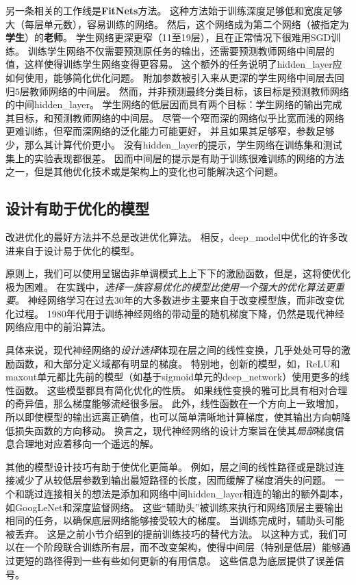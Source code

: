 另一条相关的工作线是\textbf{FitNets}\citep{Romero-et-al-ICLR2015-small}方法。
这种方法始于训练深度足够低和宽度足够大（每层单元数），容易训练的网络。
然后，这个网络成为第二个网络（被指定为\textbf{学生}）的\textbf{老师}。
学生网络更深更窄（11至19层），且在正常情况下很难用SGD训练。
训练学生网络不仅需要预测原任务的输出，还需要预测教师网络中间层的值，这样使得训练学生网络变得更容易。
这个额外的任务说明了\gls{hidden_layer}应如何使用，能够简化优化问题。
附加参数被引入来从更深的学生网络中间层去回归$5$层教师网络的中间层。
然而，并非预测最终分类目标，该目标是预测教师网络的中间\gls{hidden_layer}。
学生网络的低层因而具有两个目标：学生网络的输出完成其目标，和预测教师网络的中间层。
尽管一个窄而深的网络似乎比宽而浅的网络更难训练，但窄而深网络的泛化能力可能更好，
并且如果其足够窄，参数足够少，那么其计算代价更小。
没有\gls{hidden_layer}的提示，学生网络在训练集和测试集上的实验表现都很差。
因而中间层的提示是有助于训练很难训练的网络的方法之一，但是其他优化技术或是架构上的变化也可能解决这个问题。


\subsection{设计有助于优化的模型}
\label{sec:designing_models_to_aid_optimization}
改进优化的最好方法并不总是改进优化算法。
相反，\gls{deep_model}中优化的许多改进来自于设计易于优化的模型。

原则上，我们可以使用呈锯齿非单调模式上上下下的激励函数，但是，这将使优化极为困难。
在实践中，\emph{选择一族容易优化的模型比使用一个强大的优化算法更重要}。
神经网络学习在过去30年的大多数进步主要来自于改变模型族，而非改变优化过程。
1980年代用于训练神经网络的带动量的随机梯度下降，仍然是现代神经网络应用中的前沿算法。

具体来说，现代神经网络的\emph{设计选择}体现在层之间的线性变换，几乎处处可导的激励函数，和大部分定义域都有明显的梯度。
特别地，创新的模型，如，\gls{ReLU}和\gls{maxout}单元都比先前的模型（如基于\gls{sigmoid}单元的\gls{deep_network}）使用更多的线性函数。
这些模型都具有简化优化的性质。
如果线性变换的雅可比具有相对合理的奇异值，那么梯度能够流经很多层。
此外，线性函数在一个方向上一致增加，所以即使模型的输出远离正确值，也可以简单清晰地计算梯度，使其输出方向朝降低损失函数的方向移动。
换言之，现代神经网络的设计方案旨在使其\emph{局部}梯度信息合理地对应着移向一个遥远的解。

其他的模型设计技巧有助于使优化更简单。
例如，层之间的线性路径或是跳过连接减少了从较低层参数到输出最短路径的长度，因而缓解了梯度消失的问题\citep{Srivastava-et-al-arxiv2015}。
一个和跳过连接相关的想法是添加和网络中间\gls{hidden_layer}相连的输出的额外副本，如GoogLeNet\citep{Szegedy-et-al-arxiv2014}和深度监督网络\citep{Lee-et-al-2014}。
这些``辅助头''被训练来执行和网络顶层主要输出相同的任务，以确保底层网络能够接受较大的梯度。
当训练完成时，辅助头可能被丢弃。
这是之前小节介绍到的提前训练技巧的替代方法。
以这种方式，我们可以在一个阶段联合训练所有层，而不改变架构，使得中间层（特别是低层）能够通过更短的路径得到一些有些如何更新的有用信息。
这些信息为底层提供了误差信号。

